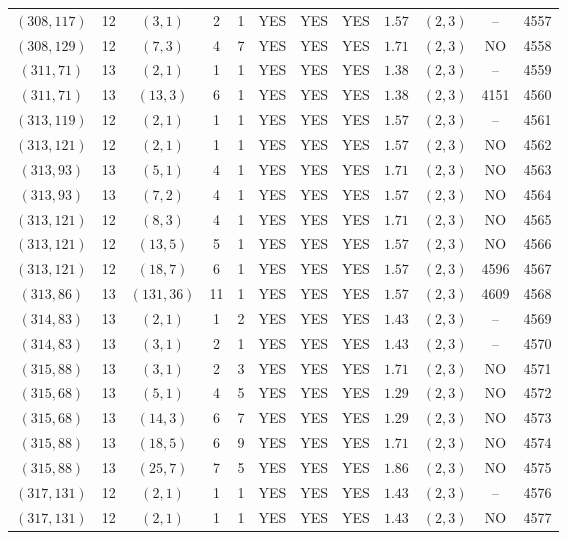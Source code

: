 \begin{longtable}{|c|c|c|c|c|c|c|c|c|c|c|c|}
$(308,117)$ & 12 & $(3,1)$ & 2 & 1 & YES & YES & YES & $1.57$ & $(2,3)$ & -- & 4557\\
$(308,129)$ & 12 & $(7,3)$ & 4 & 7 & YES & YES & YES & $1.71$ & $(2,3)$ & NO & 4558\\
$(311,71)$ & 13 & $(2,1)$ & 1 & 1 & YES & YES & YES & $1.38$ & $(2,3)$ & -- & 4559\\
$(311,71)$ & 13 & $(13,3)$ & 6 & 1 & YES & YES & YES & $1.38$ & $(2,3)$ & 4151 & 4560\\
$(313,119)$ & 12 & $(2,1)$ & 1 & 1 & YES & YES & YES & $1.57$ & $(2,3)$ & -- & 4561\\
$(313,121)$ & 12 & $(2,1)$ & 1 & 1 & YES & YES & YES & $1.57$ & $(2,3)$ & NO & 4562\\
$(313,93)$ & 13 & $(5,1)$ & 4 & 1 & YES & YES & YES & $1.71$ & $(2,3)$ & NO & 4563\\
$(313,93)$ & 13 & $(7,2)$ & 4 & 1 & YES & YES & YES & $1.57$ & $(2,3)$ & NO & 4564\\
$(313,121)$ & 12 & $(8,3)$ & 4 & 1 & YES & YES & YES & $1.71$ & $(2,3)$ & NO & 4565\\
$(313,121)$ & 12 & $(13,5)$ & 5 & 1 & YES & YES & YES & $1.57$ & $(2,3)$ & NO & 4566\\
$(313,121)$ & 12 & $(18,7)$ & 6 & 1 & YES & YES & YES & $1.57$ & $(2,3)$ & 4596 & 4567\\
$(313,86)$ & 13 & $(131,36)$ & 11 & 1 & YES & YES & YES & $1.57$ & $(2,3)$ & 4609 & 4568\\
$(314,83)$ & 13 & $(2,1)$ & 1 & 2 & YES & YES & YES & $1.43$ & $(2,3)$ & -- & 4569\\
$(314,83)$ & 13 & $(3,1)$ & 2 & 1 & YES & YES & YES & $1.43$ & $(2,3)$ & -- & 4570\\
$(315,88)$ & 13 & $(3,1)$ & 2 & 3 & YES & YES & YES & $1.71$ & $(2,3)$ & NO & 4571\\
$(315,68)$ & 13 & $(5,1)$ & 4 & 5 & YES & YES & YES & $1.29$ & $(2,3)$ & NO & 4572\\
$(315,68)$ & 13 & $(14,3)$ & 6 & 7 & YES & YES & YES & $1.29$ & $(2,3)$ & NO & 4573\\
$(315,88)$ & 13 & $(18,5)$ & 6 & 9 & YES & YES & YES & $1.71$ & $(2,3)$ & NO & 4574\\
$(315,88)$ & 13 & $(25,7)$ & 7 & 5 & YES & YES & YES & $1.86$ & $(2,3)$ & NO & 4575\\
$(317,131)$ & 12 & $(2,1)$ & 1 & 1 & YES & YES & YES & $1.43$ & $(2,3)$ & -- & 4576\\
$(317,131)$ & 12 & $(2,1)$ & 1 & 1 & YES & YES & YES & $1.43$ & $(2,3)$ & NO & 4577\\

\end{longtable}
